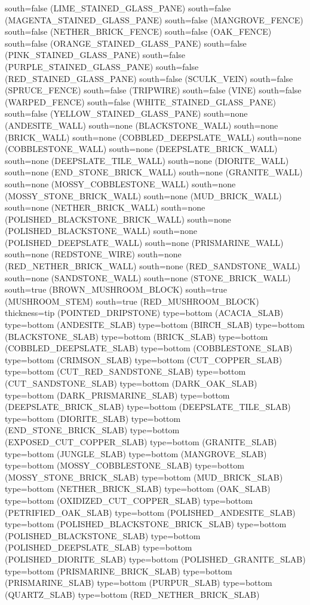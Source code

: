 \documentclass[11pt]{article}
\begin{document}
south=false (LIME_STAINED_GLASS_PANE)
south=false (MAGENTA_STAINED_GLASS_PANE)
south=false (MANGROVE_FENCE)
south=false (NETHER_BRICK_FENCE)
south=false (OAK_FENCE)
south=false (ORANGE_STAINED_GLASS_PANE)
south=false (PINK_STAINED_GLASS_PANE)
south=false (PURPLE_STAINED_GLASS_PANE)
south=false (RED_STAINED_GLASS_PANE)
south=false (SCULK_VEIN)
south=false (SPRUCE_FENCE)
south=false (TRIPWIRE)
south=false (VINE)
south=false (WARPED_FENCE)
south=false (WHITE_STAINED_GLASS_PANE)
south=false (YELLOW_STAINED_GLASS_PANE)
south=none (ANDESITE_WALL)
south=none (BLACKSTONE_WALL)
south=none (BRICK_WALL)
south=none (COBBLED_DEEPSLATE_WALL)
south=none (COBBLESTONE_WALL)
south=none (DEEPSLATE_BRICK_WALL)
south=none (DEEPSLATE_TILE_WALL)
south=none (DIORITE_WALL)
south=none (END_STONE_BRICK_WALL)
south=none (GRANITE_WALL)
south=none (MOSSY_COBBLESTONE_WALL)
south=none (MOSSY_STONE_BRICK_WALL)
south=none (MUD_BRICK_WALL)
south=none (NETHER_BRICK_WALL)
south=none (POLISHED_BLACKSTONE_BRICK_WALL)
south=none (POLISHED_BLACKSTONE_WALL)
south=none (POLISHED_DEEPSLATE_WALL)
south=none (PRISMARINE_WALL)
south=none (REDSTONE_WIRE)
south=none (RED_NETHER_BRICK_WALL)
south=none (RED_SANDSTONE_WALL)
south=none (SANDSTONE_WALL)
south=none (STONE_BRICK_WALL)
south=true (BROWN_MUSHROOM_BLOCK)
south=true (MUSHROOM_STEM)
south=true (RED_MUSHROOM_BLOCK)
thickness=tip (POINTED_DRIPSTONE)
type=bottom (ACACIA_SLAB)
type=bottom (ANDESITE_SLAB)
type=bottom (BIRCH_SLAB)
type=bottom (BLACKSTONE_SLAB)
type=bottom (BRICK_SLAB)
type=bottom (COBBLED_DEEPSLATE_SLAB)
type=bottom (COBBLESTONE_SLAB)
type=bottom (CRIMSON_SLAB)
type=bottom (CUT_COPPER_SLAB)
type=bottom (CUT_RED_SANDSTONE_SLAB)
type=bottom (CUT_SANDSTONE_SLAB)
type=bottom (DARK_OAK_SLAB)
type=bottom (DARK_PRISMARINE_SLAB)
type=bottom (DEEPSLATE_BRICK_SLAB)
type=bottom (DEEPSLATE_TILE_SLAB)
type=bottom (DIORITE_SLAB)
type=bottom (END_STONE_BRICK_SLAB)
type=bottom (EXPOSED_CUT_COPPER_SLAB)
type=bottom (GRANITE_SLAB)
type=bottom (JUNGLE_SLAB)
type=bottom (MANGROVE_SLAB)
type=bottom (MOSSY_COBBLESTONE_SLAB)
type=bottom (MOSSY_STONE_BRICK_SLAB)
type=bottom (MUD_BRICK_SLAB)
type=bottom (NETHER_BRICK_SLAB)
type=bottom (OAK_SLAB)
type=bottom (OXIDIZED_CUT_COPPER_SLAB)
type=bottom (PETRIFIED_OAK_SLAB)
type=bottom (POLISHED_ANDESITE_SLAB)
type=bottom (POLISHED_BLACKSTONE_BRICK_SLAB)
type=bottom (POLISHED_BLACKSTONE_SLAB)
type=bottom (POLISHED_DEEPSLATE_SLAB)
type=bottom (POLISHED_DIORITE_SLAB)
type=bottom (POLISHED_GRANITE_SLAB)
type=bottom (PRISMARINE_BRICK_SLAB)
type=bottom (PRISMARINE_SLAB)
type=bottom (PURPUR_SLAB)
type=bottom (QUARTZ_SLAB)
type=bottom (RED_NETHER_BRICK_SLAB)
\end{document}
